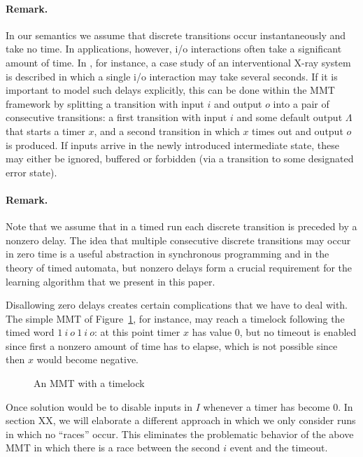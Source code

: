 \paragraph{Remark.}
In our semantics we assume that discrete transitions occur instantaneously and take no time. In applications, however, i/o interactions
often take a significant amount of time. In \cite{SHV16}, for instance, a case study of an interventional X-ray system is
described in which a single i/o interaction may take several seconds. If it is important to model such delays
explicitly, this can be done within the MMT framework by splitting a transition with input $i$ and output $o$ into
a pair of consecutive transitions: a first transition with input $i$ and some default output $\Lambda$ that starts
a timer $x$, and a second transition in which $x$ times out and output $o$ is produced.
If inputs arrive in the newly introduced intermediate state, these may either be ignored, buffered or forbidden
(via a transition to some designated error state).

\paragraph{Remark.}
Note that we assume that in a timed run each discrete transition is preceded by a nonzero delay.
The idea that multiple consecutive discrete transitions may occur in zero time is a useful abstraction in synchronous
programming and in the theory of timed automata, but nonzero delays form
a crucial requirement for the learning algorithm that we present in this paper.

Disallowing zero delays creates certain complications that we have to deal with. The simple MMT of Figure~\ref{fig:timelock}, for instance,
may reach a timelock following the timed word $1 ~ i ~ o ~ 1 ~ i ~ o$: at this point timer $x$ has value $0$, but no timeout is enabled since first a nonzero amount of time has to elapse, which is not possible since then $x$ would become negative.
\begin{figure}[ht]
\begin{center}
\caption{An MMT with a timelock}
\label{fig:timelock}
\end{center}
\end{figure}
Once solution would be to disable inputs in $I$ whenever a timer has become $0$. In section XX, we will elaborate
a different approach in which we only consider runs in which no ``races'' occur. This eliminates the problematic
behavior of the above MMT in which there is a race between the second $i$ event and the timeout.

